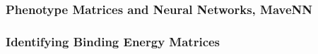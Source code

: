 \subsubsection{Phenotype Matrices and Neural Networks, MaveNN}
\subsubsection{Identifying Binding Energy Matrices}